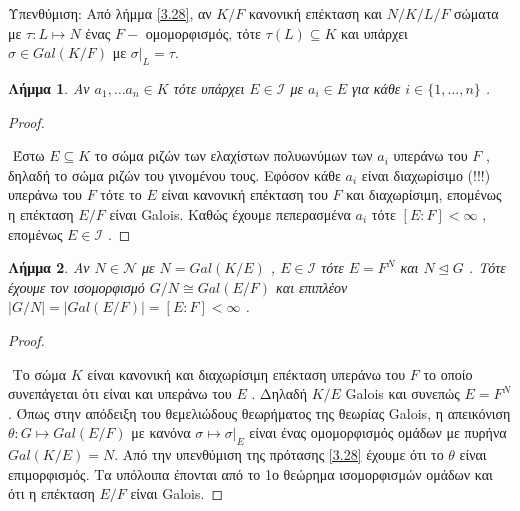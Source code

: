 \documentclass[oneside,a4paper]{article}
\newtheorem{lemma}{Λήμμα}
\newcommand {\tl}{\textlatin}
\begin{document}
Υπενθύμιση: Από λήμμα \ref{3.28}, αν $K/F$ κανονική επέκταση και $N/K/L/F$ σώματα με $\tau :L \mapsto N$ ένας $F-$ ομομορφισμός, τότε $\tau(L) \subseteq K$ και υπάρχει $\sigma \in Gal(K/F)$ με $\sigma|_L = \tau$.


\begin{lemma} \label{17.1} Aν $a_1 , \ldots a_n \in K$ τότε υπάρχει $E \in \mathcal{I}$ με $a_i \in E$ για κάθε $i \in \{1,\dots, n\}$ .
\end{lemma}
\begin{proof} $ $%


$ $\newline
Έστω $E\subseteq K$ το σώμα ριζών των ελαχίστων πολυωνύμων των $a_i$ υπεράνω του $F$ , δηλαδή το σώμα ριζών του γινομένου τους. Εφόσον κάθε $a_i$ είναι διαχωρίσιμο (!!!) υπεράνω του $F$ τότε το $E$ είναι κανονική επέκταση του $F$ και διαχωρίσιμη, επομένως η επέκταση $E/F$ είναι \tl{Galois}. Καθώς έχουμε πεπερασμένα $a_i$ τότε $[E:F]< \infty$ , επομένως $E \in \mathcal{I}$ .

\end{proof}

\begin{lemma} \label{17.2} Αν $N \in \mathcal{N}$ με $N = Gal(K/E)$ , $E \in \mathcal{I}$ τότε $E=F^N$ και $N\unlhd G$ . Τότε έχουμε τον ισομορφισμό $G/N \cong Gal(E/F)$ και επιπλέον $|G/N| = |Gal(E/F)| = [E:F] < \infty$ .
\end{lemma}  
\begin{proof} $ $
 
$ $\newline
Το σώμα $K$ είναι κανονική και διαχωρίσιμη επέκταση υπεράνω του $F$ το οποίο συνεπάγεται ότι είναι και υπεράνω του $E$ . Δηλαδή $K/E$ \tl{Galois} και συνεπώς $E = F^N$. Όπως στην απόδειξη του θεμελιώδους θεωρήματος της θεωρίας \tl{Galois}, η απεικόνιση $\theta : G \mapsto Gal(E/F)$ με κανόνα $\sigma \mapsto \sigma|_E$ είναι ένας ομομορφισμός ομάδων με πυρήνα $Gal(K/E) = N$. Από την υπενθύμιση της πρότασης \ref{3.28} έχουμε ότι το $\theta$ είναι επιμορφισμός. Τα υπόλοιπα έπονται από το 1ο θεώρημα ισομορφισμών ομάδων και ότι η επέκταση $E/F$ είναι \tl{Galois}.
\end{proof}
\end{document}
